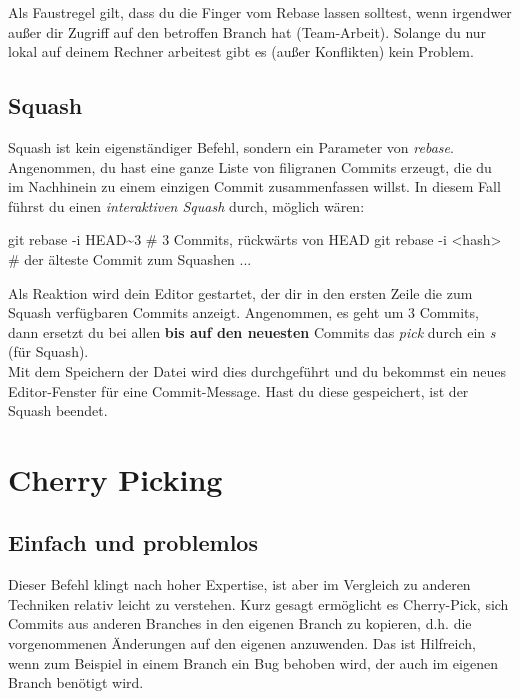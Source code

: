\documentclass[
  ngerman,
  letterpaper,
  DIV=11]{scrreprt}
\newenvironment{Shaded}{\begin{snugshade}}{\end{snugshade}}
\newcommand{\AttributeTok}[1]{\textcolor[rgb]{0.40,0.45,0.13}{#1}}
\newcommand{\CommentTok}[1]{\textcolor[rgb]{0.37,0.37,0.37}{#1}}
\newcommand{\ExtensionTok}[1]{\textcolor[rgb]{0.00,0.23,0.31}{#1}}
\newcommand{\FunctionTok}[1]{\textcolor[rgb]{0.28,0.35,0.67}{#1}}
\newcommand{\NormalTok}[1]{\textcolor[rgb]{0.00,0.23,0.31}{#1}}
\newcommand{\OperatorTok}[1]{\textcolor[rgb]{0.37,0.37,0.37}{#1}}
\begin{document}
Als Faustregel gilt, dass du die Finger vom Rebase lassen solltest, wenn
irgendwer außer dir Zugriff auf den betroffen Branch hat (Team-Arbeit).
Solange du nur lokal auf deinem Rechner arbeitest gibt es (außer
Konflikten) kein Problem.

\section{Squash}\label{squash}

Squash ist kein eigenständiger Befehl, sondern ein Parameter von
\emph{rebase}. Angenommen, du hast eine ganze Liste von filigranen
Commits erzeugt, die du im Nachhinein zu einem einzigen Commit
zusammenfassen willst. In diesem Fall führst du einen \emph{interaktiven
Squash} durch, möglich wären:

\begin{Shaded}
\begin{Highlighting}[]
\FunctionTok{git}\NormalTok{ rebase }\AttributeTok{{-}i}\NormalTok{ HEAD\textasciitilde{}3 }\CommentTok{\# 3 Commits, rückwärts von HEAD}
\FunctionTok{git}\NormalTok{ rebase }\AttributeTok{{-}i} \OperatorTok{\textless{}}\NormalTok{hash}\OperatorTok{\textgreater{}} \CommentTok{\# der älteste Commit zum Squashen}
\ExtensionTok{...}
\end{Highlighting}
\end{Shaded}

Als Reaktion wird dein Editor gestartet, der dir in den ersten Zeile die
zum Squash verfügbaren Commits anzeigt. Angenommen, es geht um 3
Commits, dann ersetzt du bei allen \textbf{bis auf den neuesten} Commits
das \emph{pick} durch ein \emph{s} (für Squash).\\
Mit dem Speichern der Datei wird dies durchgeführt und du bekommst ein
neues Editor-Fenster für eine Commit-Message. Hast du diese gespeichert,
ist der Squash beendet.


\chapter{Cherry Picking}\label{cherry-picking}

\section{Einfach und problemlos}\label{einfach-und-problemlos}

Dieser Befehl klingt nach hoher Expertise, ist aber im Vergleich zu
anderen Techniken relativ leicht zu verstehen. Kurz gesagt ermöglicht es
Cherry-Pick, sich Commits aus anderen Branches in den eigenen Branch zu
kopieren, d.h. die vorgenommenen Änderungen auf den eigenen anzuwenden.
Das ist Hilfreich, wenn zum Beispiel in einem Branch ein Bug behoben
wird, der auch im eigenen Branch benötigt wird.
\end{document}
